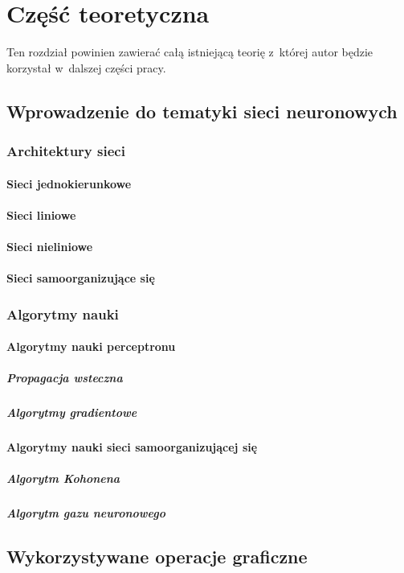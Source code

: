 \chapter{Część teoretyczna}\label{chap:teoria}
Ten rozdział powinien zawierać całą istniejącą teorię z~której autor będzie korzystał w~dalszej części pracy.

\section{Wprowadzenie do tematyki sieci neuronowych} \label{sec:sieci}

\subsection{Architektury sieci}
\subsubsection{Sieci jednokierunkowe}
\subsubsection{Sieci liniowe}
\subsubsection{Sieci nieliniowe}
\subsubsection{Sieci samoorganizujące się} 

\subsection{Algorytmy nauki}
\subsubsection{Algorytmy nauki perceptronu}
\paragraph{Propagacja wsteczna}
\paragraph{Algorytmy gradientowe}
\subsubsection{Algorytmy nauki sieci samoorganizującej się}
\paragraph{Algorytm Kohonena}
\paragraph{Algorytm gazu neuronowego}


\section{Wykorzystywane operacje graficzne}\label{sec:grafika}